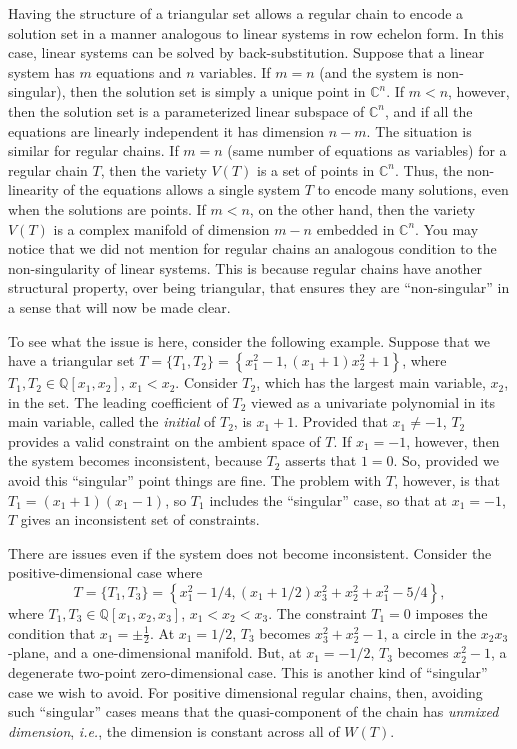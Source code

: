 Having the structure of a triangular set allows a regular chain to
encode a solution set in a manner analogous to linear systems in row
echelon form. In this case, linear systems can be solved by
back-substitution. Suppose that a linear system has $m$ equations and
$n$ variables.  If $m=n$ (and the system is non-singular), then the
solution set is simply a unique point in $\mathbb{C}^n$. If $m<n$,
however, then the solution set is a parameterized linear subspace of
$\mathbb{C}^n$, and if all the equations are linearly independent it
has dimension $n-m$. The situation is similar for regular chains. If
$m=n$ (same number of equations as variables) for a regular chain $T$,
then the variety $V(T)$ is a set of points in $\mathbb{C}^n$. Thus,
the non-linearity of the equations allows a single system $T$ to
encode many solutions, even when the solutions are points. If $m<n$,
on the other hand, then the variety $V(T)$ is a complex manifold of
dimension $m-n$ embedded in $\mathbb{C}^n$. You may notice that we did
not mention for regular chains an analogous condition to the
non-singularity of linear systems. This is because regular chains have
another structural property, over being triangular, that ensures they
are ``non-singular'' in a sense that will now be made clear.

To see what the issue is here, consider the following example. Suppose
that we have a triangular set $T=\{T_1,T_2\}=\left\{ x_1^2 - 1, (x_1 + 1) x_2^2 + 1 \right\}$, 
where $T_1,T_2\in\mathbb{Q}[x_1,x_2]$, $x_1<x_2$. Consider $T_2$, 
which has the largest main variable, $x_2$, in the set. The leading coefficient 
of $T_2$ viewed as a univariate polynomial in its main variable, called 
the \emph{initial} of $T_2$, is $x_1+1$. Provided that $x_1\neq -1$, $T_2$ 
provides a valid constraint on the ambient space of $T$. If $x_1=-1$, however, 
then the system becomes inconsistent, because $T_2$ asserts that $1=0$. So, 
provided we avoid this ``singular'' point things are fine. The problem with $T$, 
however, is that $T_1=(x_1+1)(x_1-1)$, so $T_1$ includes the ``singular'' case, so 
that at $x_1=-1$, $T$ gives an inconsistent set of constraints.

There are issues even if the system does not become inconsistent. 
Consider the positive-dimensional case where  
$$T=\{T_1,T_3\}=\left\{ x_1^2 - 1/4, (x_1+1/2)x_3^2+x_2^2+x_1^2-5/4 \right\},$$ 
where $T_1,T_3\in\mathbb{Q}[x_1,x_2,x_3]$, $x_1<x_2<x_3$. The constraint $T_1=0$ imposes the condition
that $x_1=\pm\tfrac{1}{2}$. At $x_1=1/2$, $T_3$ becomes $x_3^2+x_2^2-1$, a circle in the $x_2x_3$-plane, and a one-dimensional manifold. But, at $x_1=-1/2$, $T_3$ becomes $x_2^2-1$, a degenerate two-point zero-dimensional case. This is another kind of ``singular'' case we wish to avoid. For positive dimensional regular chains, then, avoiding such ``singular'' cases means that the quasi-component of the chain has \emph{unmixed dimension}, \emph{i.e.}, the dimension is constant across all of $W(T)$.

